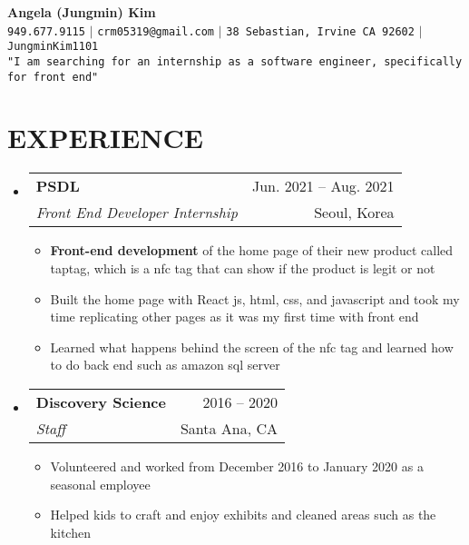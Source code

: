 \documentclass[letterpaper,11pt]{article}
\makeatletter
\newcommand{\resumeItem}[1]{
  \item\small{
    {#1 \vspace{-1pt}}
  }
}
\newcommand{\resumeSubheading}[4]{
  \vspace{-1pt}\item
    \begin{tabular*}{\textwidth}[t]{l@{\extracolsep{\fill}}r}
      \textbf{#1} & {\color{dark-grey}\small #2}\vspace{1pt}\\ %
      \textit{#3} & {\color{dark-grey} \small #4}\\ %
    \end{tabular*}\vspace{-4pt}
}
\newcommand{\resumeSubHeadingListStart}{\begin{itemize}[leftmargin=0in, label={}]}
\newcommand{\resumeSubHeadingListEnd}{\end{itemize}}
\newcommand{\resumeItemListStart}{\begin{itemize}}
\newcommand{\resumeItemListEnd}{\end{itemize}\vspace{0pt}}
\makeatother
\begin{document}
\begin{center}
    \textbf{\Huge Angela (Jungmin) Kim} \\ \vspace{5pt}
    \small \faPhone* \texttt{949.677.9115} \hspace{1pt} $|$
    \hspace{1pt} \faEnvelope \hspace{2pt} \texttt{crm05319@gmail.com} \hspace{1pt} $|$ 
    \hspace{1pt} \faMapMarker* \hspace{2pt}\texttt{38 Sebastian, Irvine CA 92602} \hspace{1pt} $|$ 
    \hspace{1pt} \faGithub \hspace{2pt}\texttt{JungminKim1101} \\ \vspace{2pt}
    \texttt{"I am searching for an internship as a software engineer, specifically for front end"}
\end{center}

\section{EXPERIENCE}
  \resumeSubHeadingListStart

    \resumeSubheading
      {PSDL}{Jun. 2021 -- Aug. 2021}
      {Front End Developer Internship}{Seoul, Korea}
      \resumeItemListStart
        \resumeItem{\textbf{Front-end development} of the home page of their new product called taptag, which is a nfc tag that can show if the product is legit or not}
        \resumeItem{Built the home page with React js, html, css, and javascript and took my time replicating other pages as it was my first time with front end}
        \resumeItem{Learned what happens behind the screen of the nfc tag and learned how to do back end such as amazon sql server}

    \resumeItemListEnd

    \resumeSubheading
      {Discovery Science}{2016 -- 2020}
      {Staff}{Santa Ana, CA}
      \resumeItemListStart
        \resumeItem{Volunteered and worked from December 2016 to January 2020 as a seasonal employee}
        \resumeItem{Helped kids to craft and enjoy exhibits and cleaned areas such as the kitchen}
      \resumeItemListEnd

  \resumeSubHeadingListEnd
\end{document}
